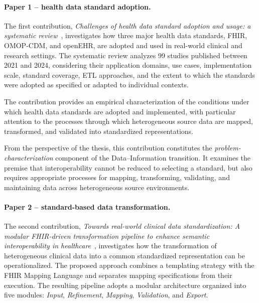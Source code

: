 \paragraph{Paper 1 -- health data standard adoption.}
The first contribution, \emph{Challenges of health data standard adoption and usage: a systematic review}~\cite{marfoglia2026challenges}, investigates how three major health data standards, FHIR, OMOP-CDM, and openEHR, are adopted and used in real-world clinical and research settings. The systematic review analyzes 99 studies published between 2021 and 2024, considering their application domains, use cases, implementation scale, standard coverage, ETL approaches, and the extent to which the standards were adopted as specified or adapted to individual contexts.

The contribution provides an empirical characterization of the conditions under which health data standards are adopted and implemented, with particular attention to the processes through which heterogeneous source data are mapped, transformed, and validated into standardized representations.

From the perspective of the thesis, this contribution constitutes the \emph{problem-characterization} component of the Data--Information transition. It examines the premise that interoperability cannot be reduced to selecting a standard, but also requires appropriate processes for mapping, transforming, validating, and maintaining data across heterogeneous source environments.

\paragraph{Paper 2 -- standard-based data transformation.}
The second contribution, \emph{Towards real-world clinical data standardization: A modular FHIR-driven transformation pipeline to enhance semantic interoperability in healthcare}~\cite{marfoglia_towards_2025}, investigates how the transformation of heterogeneous clinical data into a common standardized representation can be operationalized. The proposed approach combines a templating strategy with the FHIR Mapping Language and separates mapping specifications from their execution. The resulting pipeline adopts a modular architecture organized into five modules: \emph{Input}, \emph{Refinement}, \emph{Mapping}, \emph{Validation}, and \emph{Export}.

